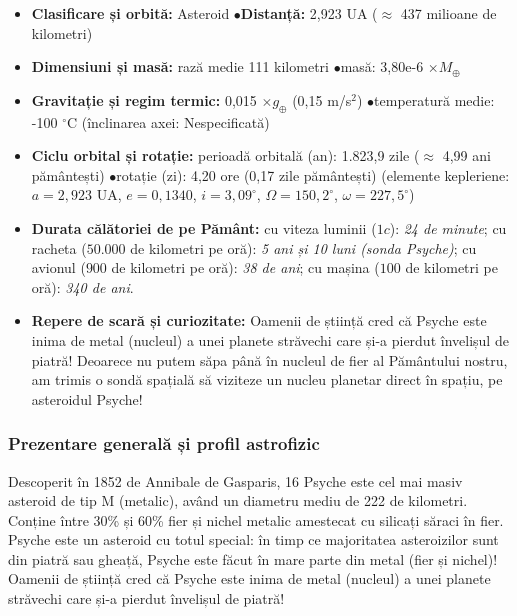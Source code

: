 \begin{tcolorbox}[orbitardata, title={\textbf{Repere esențiale: 16 Psyche}}]
\small
\begin{itemize}[leftmargin=1.4em, itemsep=2pt, topsep=2pt]
  \item \textbf{Clasificare și orbită:} Asteroid \quad$\bullet$\quad \textbf{Distanță:} 2,923 UA ($\approx$ 437 milioane de kilometri)
  \item \textbf{Dimensiuni și masă:} rază medie 111 kilometri \quad$\bullet$\quad masă: 3,80e-6 $\times M_\oplus$
  \item \textbf{Gravitație și regim termic:} 0,015 $\times g_\oplus$ (0,15 m/s$^2$) \quad$\bullet$\quad temperatură medie: -100 $^\circ$C (înclinarea axei: Nespecificată)
  \item \textbf{Ciclu orbital și rotație:} perioadă orbitală (an): 1.823,9 zile ($\approx$ 4,99 ani pământești) \quad$\bullet$\quad rotație (zi): 4,20 ore (0,17 zile pământești) (elemente kepleriene: $a = 2,923$ UA, $e = 0,1340$, $i = 3,09^\circ$, $\Omega = 150,2^\circ$, $\omega = 227,5^\circ$)
  \item \textbf{Durata călătoriei de pe Pământ:} cu viteza luminii ($1c$): \emph{24 de minute}; cu racheta ($50.000$ de kilometri pe oră): \emph{5 ani și 10 luni (sonda Psyche)}; cu avionul ($900$ de kilometri pe oră): \emph{38 de ani}; cu mașina ($100$ de kilometri pe oră): \emph{340 de ani}.
  \item \textbf{Repere de scară și curiozitate:} Oamenii de știință cred că Psyche este inima de metal (nucleul) a unei planete străvechi care și-a pierdut învelișul de piatră! Deoarece nu putem săpa până în nucleul de fier al Pământului nostru, am trimis o sondă spațială să viziteze un nucleu planetar direct în spațiu, pe asteroidul Psyche!
\end{itemize}
\end{tcolorbox}

\subsubsection*{Prezentare generală și profil astrofizic}
Descoperit în 1852 de Annibale de Gasparis, 16 Psyche este cel mai masiv asteroid de tip M (metalic), având un diametru mediu de 222 de kilometri. Conține între 30\% și 60\% fier și nichel metalic amestecat cu silicați săraci în fier. Psyche este un asteroid cu totul special: în timp ce majoritatea asteroizilor sunt din piatră sau gheață, Psyche este făcut în mare parte din metal (fier și nichel)! Oamenii de știință cred că Psyche este inima de metal (nucleul) a unei planete străvechi care și-a pierdut învelișul de piatră!

